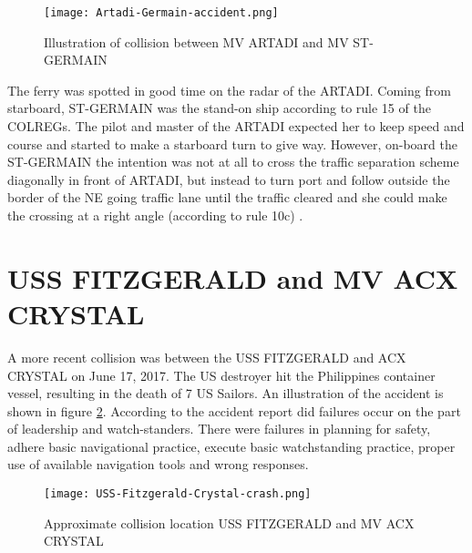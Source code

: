 \begin{figure}[H]
	\centering
	\texttt{[image: Artadi-Germain-accident.png]}
	\caption{Illustration of collision between MV ARTADI and MV ST-GERMAIN}
	\label{fig:Artadi-Germain}
\end{figure}

The ferry was spotted in good time on the radar of the ARTADI. Coming from starboard, ST-GERMAIN was the stand-on ship according to rule 15 of the \ac{COLREGs}. The pilot and master of the ARTADI expected her to keep speed and course and started to make a starboard turn to give way. However, on-board the ST-GERMAIN the intention was not at all to cross the traffic separation scheme diagonally in front of ARTADI, but instead to turn port and follow outside the border of the NE going traffic lane until the traffic cleared and she could make the crossing at a right angle (according to rule 10c) \cite{Porathe2013}.

\newpage
\section{USS FITZGERALD and MV ACX CRYSTAL}
A more recent collision was between the USS FITZGERALD and ACX CRYSTAL on June 17, 2017. The US destroyer hit the Philippines container vessel, resulting in the death of 7 US Sailors. An illustration of the accident is shown in figure \ref{fig:Accident-USS-Fitzgerald-Crystal}. According to the accident report did failures occur on the part of leadership and watch-standers. There were failures in planning for safety, adhere basic navigational practice, execute basic watchstanding practice, proper use of available navigation tools and wrong responses.

\begin{figure}[H]
	\centering
	\texttt{[image: USS-Fitzgerald-Crystal-crash.png]}
	\caption{Approximate collision location USS FITZGERALD and MV ACX CRYSTAL}
	\label{fig:Accident-USS-Fitzgerald-Crystal}
\end{figure}

